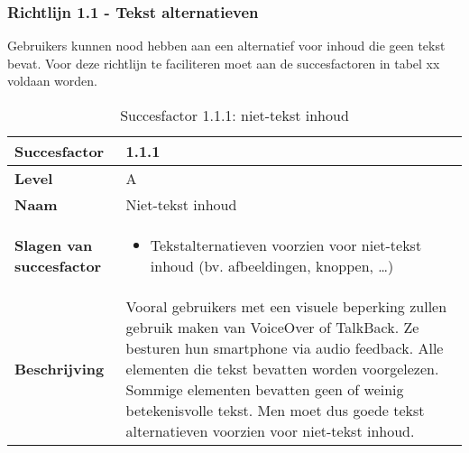 \subsubsection{Richtlijn 1.1 - Tekst alternatieven}
Gebruikers kunnen nood hebben aan een alternatief voor inhoud die geen tekst bevat. Voor deze richtlijn te faciliteren moet aan de succesfactoren in tabel xx voldaan worden.
\newpage
\begin{table}[H]
    \centering
    \caption{Succesfactor 1.1.1: niet-tekst inhoud}
 \hspace*{-1cm}\begin{tabular}{|l|p{12cm}|} 
        \hline
        \textbf{Succesfactor}                & 1.1.1                                                                                                                                                                                                                                                                                                             \\ 
        \hline
        \textbf{Level}                       & A                                                                                                                                                                                                                                                                                                                                                                             \\ 
        \hline
        \textbf{Naam}                        & Niet-tekst inhoud~                                                                                                                                                                                                                                                                                                                                                            \\ 
        \hline
        \textbf{Slagen van succesfactor}     & \begin{itemize}
            \item Tekstalternatieven voorzien voor niet-tekst inhoud (bv. afbeeldingen, knoppen, …)
        \end{itemize}                                                                                                                                                                                                      \\ 
        \hline
        \textbf{Beschrijving}                & Vooral gebruikers met een visuele beperking zullen gebruik maken van VoiceOver of TalkBack. Ze besturen hun smartphone via audio feedback. Alle elementen die tekst bevatten worden voorgelezen. Sommige elementen bevatten geen of weinig betekenisvolle tekst. Men moet dus goede tekst alternatieven voorzien voor niet-tekst inhoud.  \\ 

\end{tabular}
\end{table}
